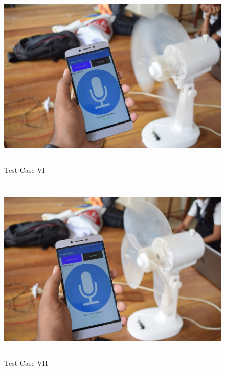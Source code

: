 \begin{figure}[H]
	
	\centering
	\includegraphics[width=\linewidth,height=9cm] {./images/p34.jpg}
	\caption{Test Case-VI}
	\label{manual}
\end{figure}

\begin{figure}[H]
	
	\centering
	\includegraphics[width=\linewidth,height=9cm] {./images/p35.jpg}
	\caption{Test Case-VII}
	\label{manual}
\end{figure}

